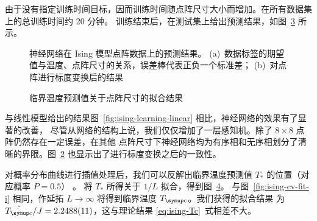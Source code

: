 由于没有指定训练时间目标，因而训练时间随点阵尺寸大小而增加。在所有数据集上的总训练时间约 20 分钟。
训练结束后，在测试集上给出预测结果，如图~\ref{fig:ising-learning-net-total} 所示。

\begin{figure}[htb]
  \centering
  \begin{subfigure}[b]{0.47\textwidth}
    \centering
    \label{fig:ising-learning-net}
  \end{subfigure}
  \begin{subfigure}[b]{0.47\textwidth}
    \centering
    \label{fig:ising-learning-net-scaled}
  \end{subfigure}
  \caption{神经网络在 Ising 模型点阵数据上的预测结果。
    (a)~数据标签的期望值与温度、点阵尺寸的关系，误差棒代表正负一个标准差；
    (b)~对点阵进行标度变换后的结果}
  \label{fig:ising-learning-net-total}
\end{figure}

\begin{figure}[htb]
  \centering
  \caption{临界温度预测值关于点阵尺寸的拟合结果}
  \label{fig:ising-learning-net-fit}
\end{figure}

与线性模型给出的结果图~\ref{fig:ising-learning-linear} 相比，神经网络的效果有了显著的改善，
尽管从网络的结构上说，我们仅仅增加了一层感知机。除了 $8 \times 8$ 点阵仍然存在一定误差，在其他
点阵尺寸下神经网络均为有序相和无序相划分了清晰的界限。图~\ref{fig:ising-learning-net-scaled}
也显示出了进行标度变换之后的一致性。

对概率分布曲线进行插值处理后，我们可以反解出临界温度预测值 $T_*$ 的位置（对应概率 $P=0.5$）
\cite{phase}。 将 $T_*$ 所得关于 $1/L$ 拟合，得到图~\ref{fig:ising-learning-net-fit}。
与图~\ref{fig:ising-cv-fit-i} 相同，作延拓 $L\to\infty$ 将得到临界温度 $\Tc$。我们获得的拟合结果
为 $\hat{\Tc}/J=\num{2.2488(11)}$，这与理论结果 \eqref{eq:ising-Tc}~式相差不大。
